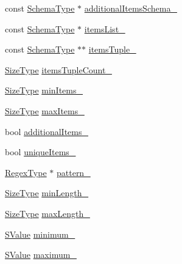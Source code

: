 \begin{DoxyCompactItemize}
\item 
const \hyperlink{classinternal_1_1Schema_ac2556ebf7a7db971e1c1c0f76eb5786e}{Schema\+Type} $\ast$ \hyperlink{classinternal_1_1Schema_a89b93a67c2038b6211a44f9f87acce67}{additional\+Items\+Schema\+\_\+}
\item 
const \hyperlink{classinternal_1_1Schema_ac2556ebf7a7db971e1c1c0f76eb5786e}{Schema\+Type} $\ast$ \hyperlink{classinternal_1_1Schema_af6c4e6c38199aaf9d63bca9fc4f2c211}{items\+List\+\_\+}
\item 
const \hyperlink{classinternal_1_1Schema_ac2556ebf7a7db971e1c1c0f76eb5786e}{Schema\+Type} $\ast$$\ast$ \hyperlink{classinternal_1_1Schema_ab4071c6507dc111c8041e66e744e2267}{items\+Tuple\+\_\+}
\item 
\hyperlink{rapidjson_8h_a5ed6e6e67250fadbd041127e6386dcb5}{Size\+Type} \hyperlink{classinternal_1_1Schema_ad043d5e6e6221e007ea308bb7187eb62}{items\+Tuple\+Count\+\_\+}
\item 
\hyperlink{rapidjson_8h_a5ed6e6e67250fadbd041127e6386dcb5}{Size\+Type} \hyperlink{classinternal_1_1Schema_a3e435762d5a3ef4696782c25c43c127d}{min\+Items\+\_\+}
\item 
\hyperlink{rapidjson_8h_a5ed6e6e67250fadbd041127e6386dcb5}{Size\+Type} \hyperlink{classinternal_1_1Schema_ac1fbdc93dbd6d951f8c2768373331285}{max\+Items\+\_\+}
\item 
bool \hyperlink{classinternal_1_1Schema_a54a7c267fb131596bfab2efca431d247}{additional\+Items\+\_\+}
\item 
bool \hyperlink{classinternal_1_1Schema_a1fc820127a8aca75e2b6a9de75ed3116}{unique\+Items\+\_\+}
\item 
\hyperlink{classinternal_1_1Schema_a78fd42fda3cecdad0ee56559b4e3cec6}{Regex\+Type} $\ast$ \hyperlink{classinternal_1_1Schema_ae69698bd9f1f38bf8aac747ed7441d79}{pattern\+\_\+}
\item 
\hyperlink{rapidjson_8h_a5ed6e6e67250fadbd041127e6386dcb5}{Size\+Type} \hyperlink{classinternal_1_1Schema_ab8d01cad4b23cc422c312c31683a9500}{min\+Length\+\_\+}
\item 
\hyperlink{rapidjson_8h_a5ed6e6e67250fadbd041127e6386dcb5}{Size\+Type} \hyperlink{classinternal_1_1Schema_a25a018785d49a41be097b694020f603d}{max\+Length\+\_\+}
\item 
\hyperlink{classinternal_1_1Schema_ab3a07540a27d4cc2b0e260290c5c5771}{S\+Value} \hyperlink{classinternal_1_1Schema_a99647ee0d10cc4fcc6220d89db1fa6bc}{minimum\+\_\+}
\item 
\hyperlink{classinternal_1_1Schema_ab3a07540a27d4cc2b0e260290c5c5771}{S\+Value} \hyperlink{classinternal_1_1Schema_a35abdff691fd5653b0a2e66b1058486f}{maximum\+\_\+}
$$
\end{DoxyCompactItemize}
